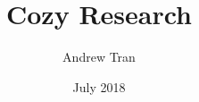 \documentclass[12pt]{article}
\title{Cozy Research}
\author{Andrew Tran}
\date{July 2018}
\begin{document}
\maketitle

\section*{}
\end{document}
